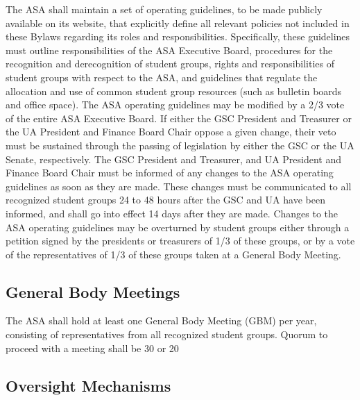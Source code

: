 \documentclass[12pt]{article}
\begin{document}
The ASA shall maintain a set of operating guidelines, to be made publicly available on its website, that explicitly define all relevant policies not included in these Bylaws regarding its roles and responsibilities. Specifically, these guidelines must outline responsibilities of the ASA Executive Board, procedures for the recognition and derecognition of student groups, rights and responsibilities of student groups with respect to the ASA, and guidelines that regulate the allocation and use of common student group resources (such as bulletin boards and office space). The ASA operating guidelines may be modified by a 2/3 vote of the entire ASA Executive Board. If either the GSC President and Treasurer or the UA President and Finance Board Chair oppose a given change, their veto must be sustained through the passing of legislation by either the GSC or the UA Senate, respectively. The GSC President and Treasurer, and UA President and Finance Board Chair must be informed of any changes to the ASA operating guidelines as soon as they are made. These changes must be communicated to all recognized student groups 24 to 48 hours after the GSC and UA have been informed, and shall go into effect 14 days after they are made. Changes to the ASA operating guidelines may be overturned by student groups either through a petition signed by the presidents or treasurers of 1/3 of these groups, or by a vote of the representatives of 1/3 of these groups taken at a General Body Meeting.

\subsection{General Body Meetings}

The ASA shall hold at least one General Body Meeting (GBM) per year, consisting of representatives from all recognized student groups. Quorum to proceed with a meeting shall be 30 or 20%

\subsection{Oversight Mechanisms}
\end{document}
